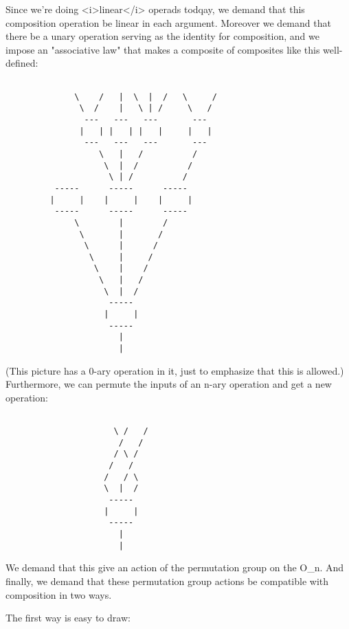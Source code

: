 Since we're doing <i>linear</i> operads todqay, we demand that this
composition operation be linear in each argument.  Moreover we demand
that there be a unary operation serving as the identity for
composition, and we impose an "associative law" that makes a
composite of composites like this well-defined:


\begin{verbatim}

              \    /   |  \  |  /   \     / 
               \  /    |   \ | /     \   / 
                ---   ---   ---       ---
               |   | |   | |   |     |   |
                ---   ---   ---       ---
                   \   |   /          /
                    \  |  /          / 
                     \ | /          / 
          -----      -----      -----
         |     |    |     |    |     |
          -----      -----      -----
              \        |        /  
               \       |       /   
                \      |      /
                 \     |     / 
                  \    |    / 
                   \   |   /   
                    \  |  /
                     -----
                    |     | 
                     -----
                       |
                       |
\end{verbatim}
    
(This picture has a 0-ary operation in it, just to emphasize that this
is allowed.)  Furthermore, we can permute the inputs of an n-ary
operation and get a new operation:
                      

\begin{verbatim}

                      \ /   /
                       /   /
                      / \ /    
                     /   /   
                    /   / \
                    \  |  /
                     -----
                    |     | 
                     -----
                       |
                       |
\end{verbatim}
    

We demand that this give an action of the permutation group on the
O_{n}.  And finally, we demand that these permutation group
actions be compatible with composition in two ways.

The first way is easy to draw:


